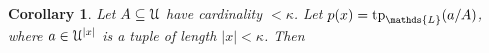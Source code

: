 \documentclass[12pt,letterpaper,oneside,reqno]{amsart}
\theoremstyle{plain}
\newtheorem{fact}[theorem]{Fact}
\newtheorem{corollary}[theorem]{Corollary}
\theoremstyle{remark}
\begin{document}
\begin{corollary}
  Let $A\subseteq{\EuScript U}$ have cardinality $<\kappa$.
  Let $p(x)={\rm tp}_\mathds{L}(a/A)$, where $a\in{\EuScript U}^{|x|}$ is a tuple of length $|x|<\kappa$.
  Then

\end{corollary}





\end{document}
